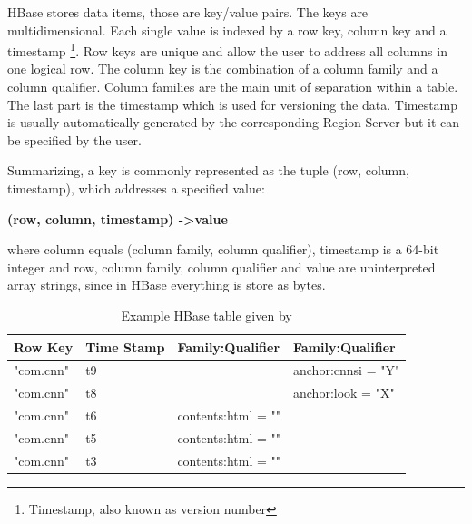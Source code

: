 HBase stores data items, those are key/value pairs. The keys are multidimensional. Each single value is indexed by a row key, column key and a timestamp \footnote{Timestamp, also known as version number}. Row keys are unique and allow the user to address all columns in one logical row. The column key is the combination of a column family and a column qualifier. Column families are the main unit of separation within a table. The last part is the timestamp which is used for versioning the data. Timestamp is usually automatically generated by the corresponding Region Server but it can be specified by the user.
\par
Summarizing, a key is commonly represented as the tuple (row, column, timestamp), which addresses a specified value:

\bigskip

			\centerline{\textbf{(row, column, timestamp) -\textgreater value}}

\bigskip 
\par
where column equals (column family, column qualifier), timestamp is a 64-bit integer and row, column family, column qualifier and value are uninterpreted array strings, since in HBase everything is store as bytes.

\begin{table}[htbp]
\begin{center}
\begin{tabular}{|l|l|l|l|}
\hline
\textbf{Row Key} & \textbf{Time Stamp} & \textbf{Family:Qualifier} & \textbf{Family:Qualifier} \\ \hline
"com.cnn" & t9 &   & anchor:cnnsi = "Y" \\ \hline
"com.cnn" & t8 &   & anchor:look = "X" \\ \hline
"com.cnn" & t6 & contents:html = "" &   \\ \cline{1-2}
"com.cnn" & t5 & contents:html = "" &   \\ \cline{1-2}
"com.cnn" & t3 & contents:html = "" &   \\ \hline
\end{tabular}
\caption{Example HBase table given by \cite{ApacheHBaseDataModel}}
\end{center}
\end{table}


